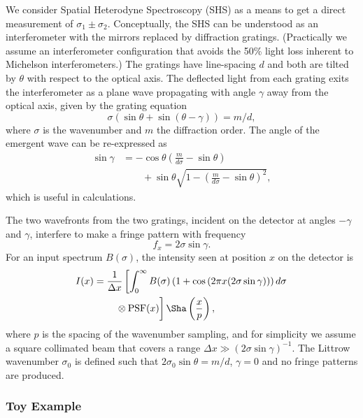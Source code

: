 \documentclass[preprint2, 10pt]{aastex}
\begin{document}
We consider Spatial Heterodyne Spectroscopy (SHS) \citep{1990SPIE.1235..622H}
as a means to get a direct measurement of  $\sigma_1\pm\sigma_2$.
Conceptually, the SHS can be understood as an interferometer with the  mirrors replaced by diffraction gratings.
(Practically we assume an interferometer configuration that  avoids the 50\% light loss inherent to  Michelson interferometers.)
The gratings have line-spacing $d$ and both are tilted
by $\theta$ with respect to the optical axis.  The deflected light from each grating exits the interferometer as a plane wave
propagating with angle $\gamma$ away from the optical axis,  given by the grating equation
\begin{equation}
\sigma\left(\sin{\theta}+\sin{\left(\theta-\gamma\right)}\right)=m/d,
\end{equation}
where $\sigma$ is the wavenumber and $m$ the diffraction order.
The angle of the emergent wave can be re-expressed as
\begin{align}
\sin{\gamma} & =-\cos{\theta} \left(\frac{m}{d\sigma} - \sin{\theta} \right) \nonumber \\
& \qquad + \sin{\theta}\sqrt{1-\left(\frac{m}{d\sigma} -\sin{\theta} \right)^2},
\end{align}
which is useful in calculations.

The two wavefronts from the two gratings, incident on the detector at angles $-\gamma$ and $\gamma$, interfere to make a fringe
pattern with  frequency
\begin{equation}
f_x=2\sigma\sin{\gamma}.
\end{equation}
For an input spectrum $B(\sigma)$, the intensity seen at position $x$ on the detector is
\begin{align}
I(x)& =\frac{1}{\Delta x}\left[\int_{0}^{\infty} B(\sigma)\left(1+\cos{\left(2 \pi x (2\sigma \sin{\gamma})\right)}\right)d\sigma \right. \nonumber \\
& \qquad \left.\vphantom{\int_{0}^{\infty}} \otimes \mbox{PSF}(x)\right]\Sha\left(\frac{x}{p}\right),
\end{align}
where  $p$ is the spacing of the wavenumber sampling, and for simplicity we assume a square collimated beam that covers
a range  $\Delta x \gg \left(2\sigma \sin{\gamma}\right)^{-1}$.
The Littrow wavenumber $\sigma_0$ is defined such that $2\sigma_0\sin{\theta}=m/d$, $\gamma=0$ and no fringe patterns are produced.

\subsubsection{Toy Example}
\label{toy:sec} 
\end{document}
